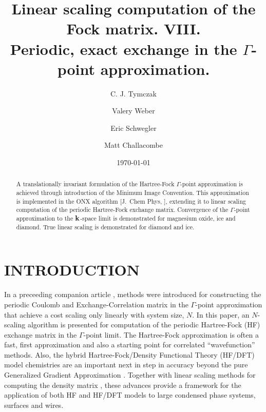 \documentclass[prb,aps,nobibnotes,twocolumn,doublespace,twocolumngrid,superbib]{revtex4}
\begin{document}
\title{Linear scaling computation of the Fock matrix. VIII. \\ 
       Periodic, exact exchange in the $\Gamma$-point approximation. }

\author{C. J. Tymczak}
\author{Valery Weber}
\author{Eric Schwegler}
\author{Matt Challacombe}




\date{\today}
\begin{abstract}
A translationally invariant formulation of the Hartree-Fock $\Gamma$-point approximation
is achieved through introduction of the Minimum Image Convention.  This approximation is 
implemented  in the ONX algorithm [J.~Chem Phys, ], extending it to linear scaling 
computation of the periodic Hartree-Fock exchange matrix.  Convergence of the 
$\Gamma$-point approximation to the ${\bf k}$-space limit is demonstrated for 
magnesium oxide, ice and diamond.  True linear scaling is demonstrated for diamond and ice. 
\end{abstract}

\pacs{}

\maketitle


\section{INTRODUCTION}

In a preceeding companion article \cite{CTymczak04A},  methods were introduced for constructing 
the periodic Coulomb and Exchange-Correlation matrix in the $\Gamma$-point approximation that 
achieve  a cost  scaling only linearly with system size, $N$.  In this paper, an $N$-scaling 
algorithm is presented for computation of the periodic Hartree-Fock (HF) exchange matrix in the 
$\Gamma$-point limit.   The Hartree-Fock approximation is often a fast, first 
approximation and also a starting point for correlated ``wavefunction'' methods.  
Also, the hybrid Hartree-Fock/Density Functional Theory (HF/DFT) model chemistries are an important next 
in step in accuracy beyond the pure Generalized Gradient Approximation \cite{Gill92,Becke93,VBarone96,CAdamo99}.
Together with linear scaling methods for computing the density matrix \cite{ANiklasson02A,ANiklasson03}, these 
advances provide a framework for the application of both HF and HF/DFT models to large condensed 
phase systems, surfaces and wires.   
\end{document}

